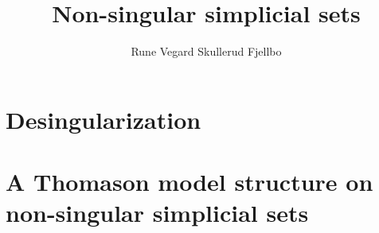 \documentclass[final]{phduio} %
\author{Rune Vegard Skullerud Fjellbo}
\title{Non-singular simplicial sets}
\affiliation
{
    University of Oslo
}
\begin{document}
    \frontmatter        %
    
    \uiotitle
    

    
    
    

    \cleartorecto
    \tableofcontents    %
    \cleartorecto
    \listoffigures
    \cleartorecto
    \listoftables
    

    \mainmatter         %
    

    

    \part{Desingularization}

    
    

    \part{A Thomason model structure on non-singular simplicial sets}
    
\end{document}
